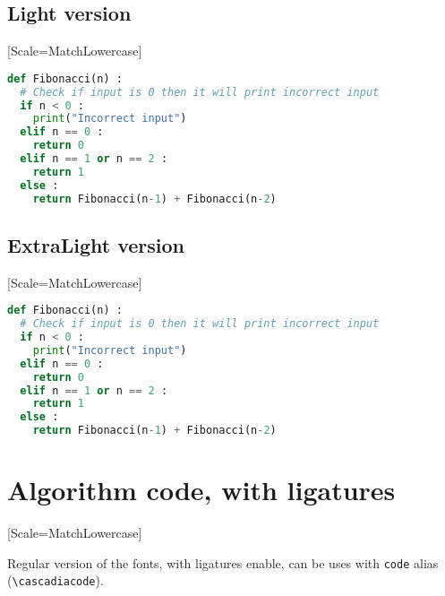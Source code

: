 \documentclass{article}
\begin{document}
\subsection{Light version}

\setmonofont{CascadiaMono-Light}[Scale=MatchLowercase]

\begin{lstlisting}[language=python,basicstyle=\footnotesize\ttfamily,commentstyle=\itshape\color{gray},keywordstyle=\bfseries\color{magenta},tabsize=4,frame=single]
def Fibonacci(n) :
  # Check if input is 0 then it will print incorrect input
  if n < 0 :
    print("Incorrect input")
  elif n == 0 :
    return 0
  elif n == 1 or n == 2 :
    return 1
  else :
    return Fibonacci(n-1) + Fibonacci(n-2)
\end{lstlisting}

\subsection{ExtraLight version}

\setmonofont{CascadiaMono-ExtraLight}[Scale=MatchLowercase]

\begin{lstlisting}[language=python,basicstyle=\footnotesize\ttfamily,commentstyle=\itshape\color{gray},keywordstyle=\bfseries\color{magenta},tabsize=4,frame=single]
def Fibonacci(n) :
  # Check if input is 0 then it will print incorrect input
  if n < 0 :
    print("Incorrect input")
  elif n == 0 :
    return 0
  elif n == 1 or n == 2 :
    return 1
  else :
    return Fibonacci(n-1) + Fibonacci(n-2)
\end{lstlisting}

\pagebreak

\section{Algorithm code, with ligatures}

\setmonofont{CMU Typewriter Text}[Scale=MatchLowercase]

Regular version of the fonts, with ligatures enable, can be uses with \texttt{code} alias (\lstinline[language={[latex]TeX},basicstyle=\ttfamily]|\cascadiacode|).

\makeatletter
\renewcommand*\verbatim@nolig@list{}
\makeatother
\end{document}
